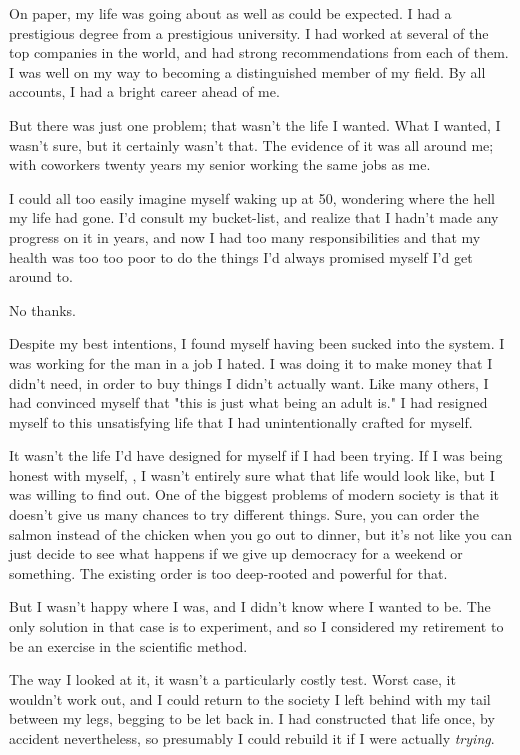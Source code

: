 \documentclass[]{book}
\begin{document}
On paper, my life was going about as well as could be expected. I had a
prestigious degree from a prestigious university. I had worked at several of the
top companies in the world, and had strong recommendations from each of them. I
was well on my way to becoming a distinguished member of my field. By all
accounts, I had a bright career ahead of me.

But there was just one problem; that wasn't the life I wanted. What I wanted, I
wasn't sure, but it certainly wasn't that. The evidence of it was all around me;
with coworkers twenty years my senior working the same jobs as me.

I could all too easily imagine myself waking up at 50, wondering where the hell
my life had gone. I'd consult my bucket-list, and realize that I hadn't made any
progress on it in years, and now I had too many responsibilities and that my
health was too too poor to do the things I'd always promised myself I'd get
around to.

No thanks.

Despite my best intentions, I found myself having been sucked into the system. I
was working for the man in a job I hated. I was doing it to make money that I
didn't need, in order to buy things I didn't actually want. Like many others, I
had convinced myself that "this is just what being an adult is." I had resigned
myself to this unsatisfying life that I had unintentionally crafted for myself.

It wasn't the life I'd have designed for myself if I had been trying. If I was
being honest with myself, , I wasn't entirely sure what that life would look
like, but I was willing to find out. One of the biggest problems of modern
society is that it doesn't give us many chances to try different things. Sure,
you can order the salmon instead of the chicken when you go out to dinner, but
it's not like you can just decide to see what happens if we give up democracy
for a weekend or something.  The existing order is too deep-rooted and powerful
for that.

But I wasn't happy where I was, and I didn't know where I wanted to be. The only
solution in that case is to experiment, and so I considered my retirement to be
an exercise in the scientific method.

The way I looked at it, it wasn't a particularly costly test. Worst case, it
wouldn't work out, and I could return to the society I left behind with my tail
between my legs, begging to be let back in. I had constructed that life once, by
accident nevertheless, so presumably I could rebuild it if I were actually
\emph{trying}.
\end{document}
